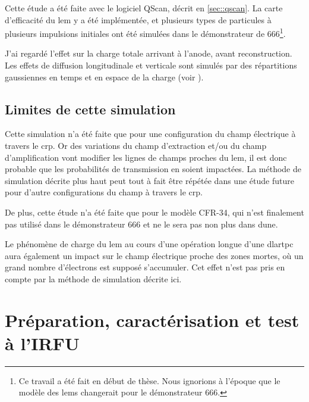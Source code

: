             Cette étude a été faite avec le logiciel QScan, décrit en \autoref{sec::qscan}. La carte d'efficacité du \gls{lem} y a été implémentée, et plusieurs types de particules à plusieurs impulsions initiales ont été simulées dans le démonstrateur de 666\footnote{Ce travail a été fait en début de thèse. Nous ignorions à l'époque que le modèle des \glspl{lem} changerait pour le démonstrateur 666.}.
            
            J'ai regardé l'effet sur la charge totale arrivant à l'anode, avant reconstruction. Les effets de diffusion longitudinale et verticale sont simulés par des répartitions gaussiennes en temps et en espace de la charge (voir \cite{Agostino2014}).
            
        
        \subsection{Limites de cette simulation}
        
            Cette simulation n'a été faite que pour une configuration du champ électrique à travers le \gls{crp}. Or des variations du champ d'extraction et/ou du champ d'amplification vont modifier les lignes de champs proches du \gls{lem}, il est donc probable que les probabilités de transmission en soient impactées. La méthode de simulation décrite plus haut peut tout à fait être répétée dans une étude future pour d'autre configurations du champ à travers le \gls{crp}.
            
            De plus, cette étude n'a été faite que pour le modèle CFR-34, qui n'est finalement pas utilisé dans le démonstrateur 666 et ne le sera pas non plus dans \gls{dune}.
            
            Le phénomène de charge du \gls{lem} au cours d'une opération longue d'une \gls{dlartpc} aura également un impact sur le champ électrique proche des zones mortes, où un grand nombre d'électrons est supposé s'accumuler. Cet effet n'est pas pris en compte par la méthode de simulation décrite ici.
        
    \section{Préparation, caractérisation et test à l'IRFU}
    

